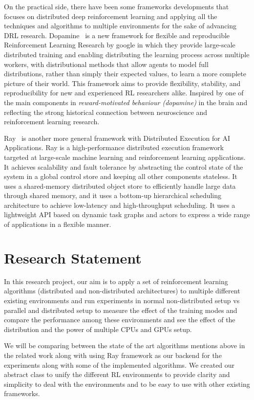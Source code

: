 On the practical side, there have been some frameworks developments that focuses on distributed deep reinforcement learning and applying all the techniques and algorithms to multiple environments for the sake of advancing DRL research. Dopamine~\parencite{castro2018dopamine} is a new framework for flexible and reproducible Reinforcement Learning Research by google in which they provide large-scale distributed training and enabling distributing the learning process across multiple workers, with distributional methods that allow agents to model full distributions, rather than simply their expected values, to learn a more complete picture of their world. This framework aims to provide flexibility, stability, and reproducibility for new and experienced RL researchers alike. Inspired by one of the main components in \textit{reward-motivated behaviour (dopamine)} in the brain and reflecting the strong historical connection between neuroscience and reinforcement learning research.

Ray~\parencite{moritz2018ray} is another more general framework with Distributed Execution for AI Applications. Ray is a high-performance distributed execution framework targeted at large-scale machine learning and reinforcement learning applications. It achieves scalability and fault tolerance by abstracting the control state of the system in a global control store and keeping all other components stateless. It uses a shared-memory distributed object store to efficiently handle large data through shared memory, and it uses a bottom-up hierarchical scheduling architecture to achieve low-latency and high-throughput scheduling. It uses a lightweight API based on dynamic task graphs and actors to express a wide range of applications in a flexible manner.


\section{Research Statement}
In this research project, our aim is to apply a set of reinforcement learning algorithms (distributed and non-distributed architectures) to multiple different existing environments and run experiments in normal non-distributed setup vs parallel and distributed setup to measure the effect of the training modes and compare the performance among these environments and see the effect of the distribution and the power of multiple CPUs and GPUs setup. 

We will be comparing between the state of the art algorithms mentions above in the related work along with using Ray framework as our backend for the experiments along with some of the implemented algorithms. We created our abstract class to unify the different RL environments to provide clarity and simplicity to deal with the environments and to be easy to use with other existing frameworks.

